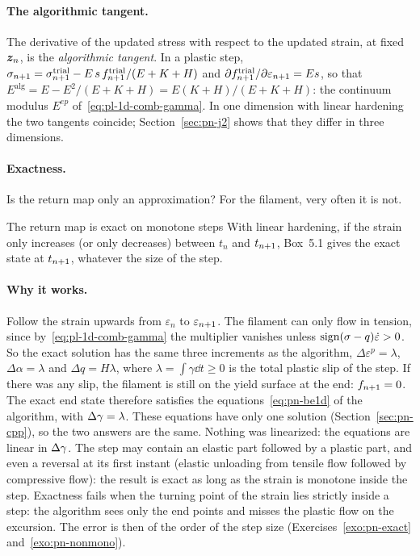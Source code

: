 \paragraph{The algorithmic tangent.}
%
The derivative of the updated stress with respect to the updated strain,
at fixed $\bm{z}_n$, is the \emph{algorithmic tangent}. In a plastic step,
$\sigma_{n+1}=\sigma^{\mathrm{trial}}_{n+1}-E\,s\,f^{\mathrm{trial}}_{n+1}/(E+K+H)$ and
$\partial f^{\mathrm{trial}}_{n+1}/\partial\varepsilon_{n+1}=Es$, so that
$E^{\mathrm{alg}}=E-E^2/(E+K+H)=E(K+H)/(E+K+H)$: the continuum modulus
$E^{ep}$ of~\eqref{eq:pl-1d-comb-gamma}. In one dimension with linear
hardening the two tangents coincide; Section~\ref{sec:pn-j2} shows that they
differ in three dimensions.

\paragraph{Exactness.}
%
Is the return map only an approximation? For the filament, very often it is
not.
\begin{gbox}{The return map is exact on monotone steps}\label{prop:pn-exact1d}
With linear hardening, if the strain only increases (or only decreases)
between $t_n$ and $t_{n+1}$, Box~5.1 gives the exact state at $t_{n+1}$, whatever
the size of the step.
\end{gbox}
\paragraph{Why it works.} Follow the strain upwards from $\varepsilon_n$ to
$\varepsilon_{n+1}$. The filament can only flow in tension, since by~\eqref{eq:pl-1d-comb-gamma}
the multiplier vanishes unless $\operatorname{sign}(\sigma-q)\dot\varepsilon>0$. So the
exact solution has the same three increments as the algorithm,
$\Delta\varepsilon^p=\lambda$, $\Delta\alpha=\lambda$ and $\Delta q=H\lambda$,
where $\lambda=\int\gamma\dd t\ge0$ is the total plastic slip of the step. If
there was any slip, the filament is still on the yield surface at the end:
$f_{n+1}=0$. The exact end state therefore satisfies the equations~\eqref{eq:pn-be1d}
of the algorithm, with $\Delta\gamma=\lambda$. These equations have only one solution
(Section~\ref{sec:pn-cpp}), so the two answers are the same. Nothing was
linearized: the equations are linear in $\Delta\gamma$.
The step may contain an elastic part followed by a plastic part, and even a
reversal at its first instant (elastic unloading from tensile flow followed by
compressive flow): the result is exact as long as the strain is monotone
inside the step. Exactness fails when the turning point of the strain lies
strictly inside a step: the algorithm sees only the end points and misses the
plastic flow on the excursion. The error is then of the order of the step
size (Exercises~\ref{exo:pn-exact} and~\ref{exo:pn-nonmono}).

